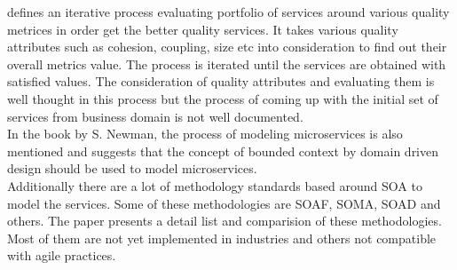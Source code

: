 \cite{Ma:2009aa} defines an iterative process evaluating portfolio of services around various quality metrices in order get the better quality services. It takes various quality attributes such as cohesion, coupling, size etc into consideration to find out their overall metrics value. The process is iterated until the services are obtained with satisfied values. The consideration of quality attributes and evaluating them is well thought in this process but the process of coming up with the initial set of services from business domain is not well documented.\\
In the book by S. Newman, the process of modeling microservices is also mentioned and suggests that the concept of bounded context by domain driven design should be used to model microservices.\cite{Newman:2015aa}\\
Additionally there are a lot of methodology standards based around \acrshort{SOA} to model the services. Some of these methodologies are \acrshort{SOAF}, \acrshort{SOMA}, \acrshort{SOAD} and others. The paper \cite{Ramollari:2016aa} presents a detail list and comparision of these methodologies. Most of them are not yet implemented in industries and others not compatible with agile practices.